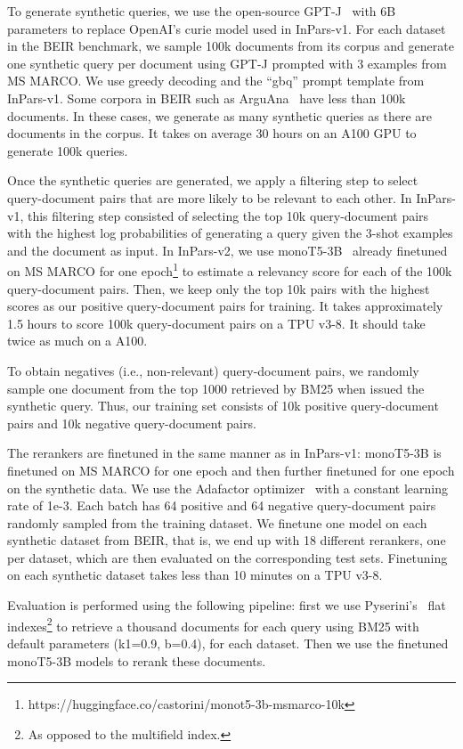 \documentclass{article}
\begin{document}
To generate synthetic queries, we use the open-source GPT-J~\cite{gpt-j} with 6B parameters to replace OpenAI's curie model used in InPars-v1.
For each dataset in the BEIR benchmark, we sample 100k documents from its corpus and generate one synthetic query per document using GPT-J prompted with 3 examples from MS MARCO. We use greedy decoding and the ``gbq'' prompt template from InPars-v1.
Some corpora in BEIR such as ArguAna~\cite{wachsmuth-etal-2018-retrieval} have less than 100k documents. In these cases, we generate as many synthetic queries as there are documents in the corpus.
It takes on average 30 hours on an A100 GPU to generate 100k queries.


Once the synthetic queries are generated, we apply a filtering step to select query-document pairs that are more likely to be relevant to each other. In InPars-v1, this filtering step consisted of selecting the top 10k query-document pairs with the highest log probabilities of generating a query given the 3-shot examples and the document as input.
In InPars-v2, we use monoT5-3B~\cite{nogueira2020document} already finetuned on MS MARCO for one epoch\footnote{https://huggingface.co/castorini/monot5-3b-msmarco-10k} to estimate a relevancy score for each of the 100k query-document pairs. Then, we keep only the top 10k pairs with the highest scores as our positive query-document pairs for training. It takes approximately 1.5 hours to score 100k query-document pairs on a TPU v3-8. It should take twice as much on a A100.

To obtain negatives (i.e., non-relevant) query-document pairs, we randomly sample one document from the top 1000 retrieved by BM25 when issued the synthetic query. Thus, our training set consists of 10k positive query-document pairs and 10k negative query-document pairs.


The rerankers are finetuned in the same manner as in InPars-v1: monoT5-3B is finetuned on MS MARCO for one epoch and then further finetuned  for one epoch on the synthetic data. We use the Adafactor optimizer~\cite{shazeer2018adafactor} with a constant learning rate of 1e-3. Each batch has 64 positive and 64 negative query-document pairs randomly sampled from the training dataset. We finetune one model on each synthetic dataset from BEIR, that is, we end up with 18 different rerankers, one per dataset, which are then evaluated on the corresponding test sets. Finetuning on each synthetic dataset takes less than 10 minutes on a TPU v3-8.


Evaluation is performed using the following pipeline: first we use Pyserini's~\cite{lin2021pyserini} flat indexes\footnote{As opposed to the multifield index.} to retrieve a thousand documents for each query using BM25 with default parameters (k1=0.9, b=0.4), for each dataset. Then we use the finetuned monoT5-3B models to rerank these documents.
\end{document}
